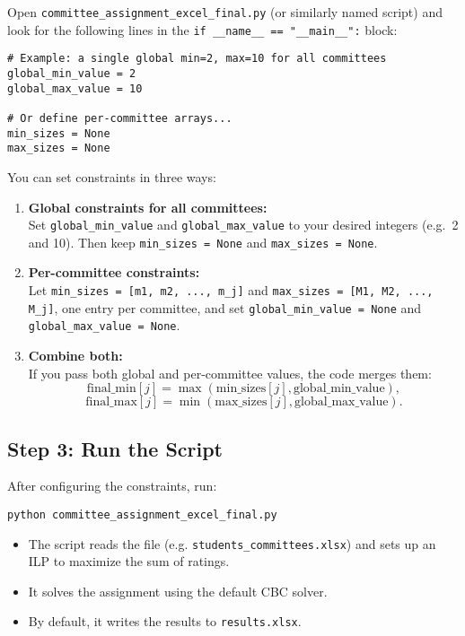\documentclass[12pt]{article}
\begin{document}
Open \texttt{committee\_assignment\_excel\_final.py} (or similarly named script)
and look for the following lines in the \verb|if __name__ == "__main__":| block:

\begin{verbatim}
# Example: a single global min=2, max=10 for all committees
global_min_value = 2
global_max_value = 10

# Or define per-committee arrays...
min_sizes = None
max_sizes = None
\end{verbatim}

You can set constraints in three ways:

\begin{enumerate}
    \item \textbf{Global constraints for all committees:}\\
          Set \texttt{global\_min\_value} and \texttt{global\_max\_value} to your desired integers
          (e.g.\ 2 and 10). Then keep \texttt{min\_sizes = None} and \texttt{max\_sizes = None}.

    \item \textbf{Per-committee constraints:}\\
          Let \texttt{min\_sizes = [m1, m2, ..., m\_j]}
          and \texttt{max\_sizes = [M1, M2, ..., M\_j]}, one entry per committee, and set
          \texttt{global\_min\_value = None} and \texttt{global\_max\_value = None}.

    \item \textbf{Combine both:}\\
          If you pass both global and per-committee values, the code merges them:
          \[
              \mathrm{final\_min}[j] = \max(\mathrm{min\_sizes}[j], \mathrm{global\_min\_value}),
          \]
          \[
              \mathrm{final\_max}[j] = \min(\mathrm{max\_sizes}[j], \mathrm{global\_max\_value}).
          \]
\end{enumerate}

\subsection{Step 3: Run the Script}

After configuring the constraints, run:

\begin{verbatim}
python committee_assignment_excel_final.py
\end{verbatim}

\begin{itemize}
    \item The script reads the file (e.g. \texttt{students\_committees.xlsx})
          and sets up an ILP to maximize the sum of ratings.
    \item It solves the assignment using the default CBC solver.
    \item By default, it writes the results to \texttt{results.xlsx}.
\end{itemize}
\end{document}
